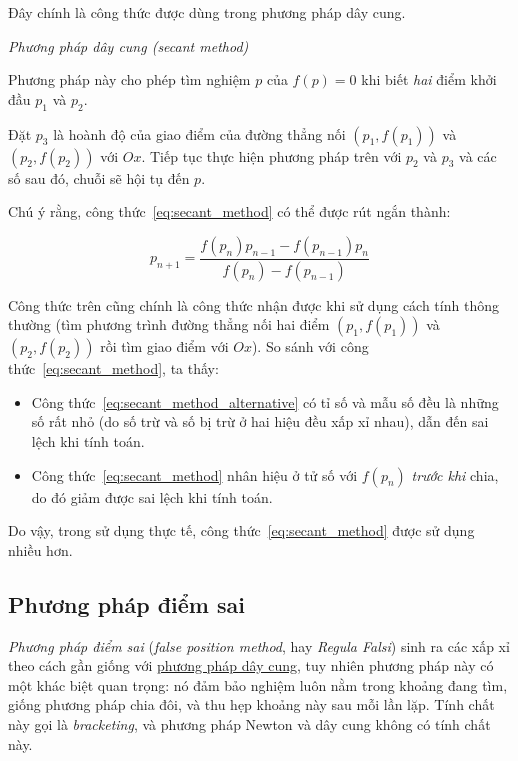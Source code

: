 \documentclass[../../Lectures]{subfiles}
\begin{document}
Đây chính là công thức được dùng trong phương pháp dây cung.

\begin{method}\label{method:secant}
    \emph{Phương pháp dây cung (secant method)}

    Phương pháp này cho phép tìm nghiệm \(p\) của \(f(p) = 0\) khi biết
    \emph{hai} điểm khởi đầu \(p_1\) và \(p_2\).

    Đặt \(p_3\) là hoành độ của giao điểm của đường thẳng nối \((p_1, f(p_1))\)
    và \((p_2, f(p_2))\) với \(Ox\). Tiếp tục thực hiện phương pháp trên với
    \(p_2\) và \(p_3\) và các số sau đó, chuỗi sẽ hội tụ đến \(p\).
\end{method}

Chú ý rằng, công thức~\ref{eq:secant_method} có thể được rút ngắn thành:

\begin{equation}\label{eq:secant_method_alternative}
    p_{n + 1} = \frac{f(p_n) p_{n - 1} - f(p_{n - 1}) p_n}{f(p_n) - f(p_{n - 1})}
\end{equation}

Công thức trên cũng chính là công thức nhận được khi sử dụng cách tính thông
thường (tìm phương trình đường thẳng nối hai điểm \((p_1, f(p_1))\) và \((p_2,
f(p_2))\) rồi tìm giao điểm với \(Ox\)). So sánh với công
thức~\eqref{eq:secant_method}, ta thấy:

\begin{itemize}
    \item Công thức~\eqref{eq:secant_method_alternative} có tỉ số và
        mẫu số đều là những số rất nhỏ (do số trừ và số bị trừ ở hai hiệu đều
        xấp xỉ nhau), dẫn đến sai lệch khi tính toán.

    \item Công thức~\eqref{eq:secant_method} nhân hiệu ở tử số với \(f(p_n)\)
        \emph{trước khi} chia, do đó giảm được sai lệch khi tính toán.
\end{itemize}

Do vậy, trong sử dụng thực tế, công thức~\ref{eq:secant_method} được sử dụng
nhiều hơn.

\subsection{Phương pháp điểm sai}

\emph{Phương pháp điểm sai} (\emph{false position method}, hay \emph{Regula
Falsi}) sinh ra các xấp xỉ theo cách gần giống với
\hyperref[method:secant]{phương pháp dây cung}, tuy nhiên phương pháp này có một
khác biệt quan trọng: nó đảm bảo nghiệm luôn nằm trong khoảng đang tìm, giống
phương pháp chia đôi, và thu hẹp khoảng này sau mỗi lần lặp. Tính chất này gọi
là \emph{bracketing}, và phương pháp Newton và dây cung không có tính chất này.
\end{document}
